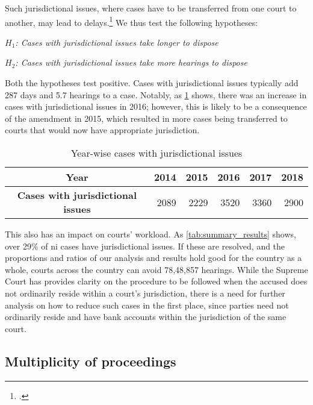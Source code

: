 Such jurisdictional issues, where cases have to be transferred from one court to another, may lead to delays.\footcite{sc2020_138, amicus2020_submission} We thus test the following hypotheses:

\begin{center}
 \textit{\(H_1\): Cases with jurisdictional issues take longer to dispose}

 \textit{\(H_2\): Cases with jurisdictional issues take more hearings to dispose}
\end{center}

Both the hypotheses test positive. Cases with jurisdictional issues typically add 287 days and 5.7 hearings to a case. Notably, as \cref{tab:year_jurisdictional} shows, there was an increase in cases with jurisdictional issues in 2016; however, this is likely to be a consequence of the amendment in 2015, which resulted in more cases being transferred to courts that would now have appropriate jurisdiction.

\begin{longtable}{@{}c|ccccc@{}}
\caption{Year-wise cases with jurisdictional issues}
\label{tab:year_jurisdictional}\\
\toprule
\textbf{Year} & \textbf{2014} & \textbf{2015} & \textbf{2016} & \textbf{2017} & \textbf{2018} \\ \midrule
\textbf{Cases with jurisdictional issues} & \multicolumn{1}{r}{2089} & \multicolumn{1}{r}{2229} & \multicolumn{1}{r}{3520} & \multicolumn{1}{r}{3360} & \multicolumn{1}{r}{2900} \\ \bottomrule
\end{longtable}

This also has an impact on courts' workload. As \cref{tab:summary_results} shows, over 29\% of \gls{ni} cases have jurisdictional issues. If these are resolved, and the proportions and ratios of our analysis and results hold good for the country as a whole, courts across the country can avoid 78,48,857 hearings. While the Supreme Court has provides clarity on the procedure to be followed when the accused does not ordinarily reside within a court's jurisdiction, there is a need for further analysis on how to reduce such cases in the first place, since parties need not ordinarily reside and have bank accounts within the jurisdiction of the same court.

\subsection{Multiplicity of proceedings}

